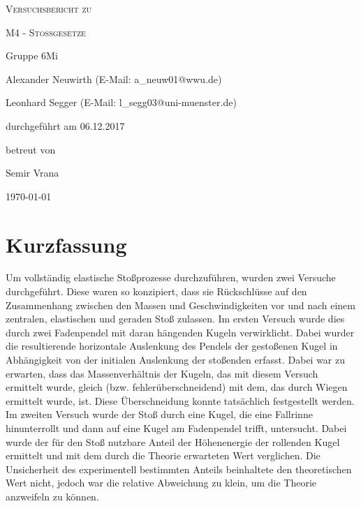 \documentclass[
	a4paper,
	12pt,
	pagesize,
	ngerman
]{scrartcl}
\begin{document}
	
	\begin{titlepage}
		\centering
		{\scshape\LARGE Versuchsbericht zu \par}
		\vspace{1cm}
		{\scshape\huge M4 - Stoßgesetze\par}
		\vspace{2.5cm}
		{\LARGE Gruppe 6Mi \par}
		\vspace{0.5cm}
		
		{\large Alexander Neuwirth (E-Mail: a\_neuw01@wwu.de) \par}
		{\large Leonhard Segger (E-Mail: l\_segg03@uni-muenster.de) \par}
		\vfill
		
		durchgeführt am 06.12.2017\par
		betreut von\par
		{\large Semir Vrana}
		
		\vfill
		
		{\large \today\par}
	\end{titlepage}
	\tableofcontents
	\newpage
	
	\section{Kurzfassung}
	Um vollständig elastische Stoßprozesse durchzuführen, wurden zwei Versuche durchgeführt.
	Diese waren so konzipiert, dass sie Rückschlüsse auf den Zusammenhang zwischen den Massen und Geschwindigkeiten vor und nach einem zentralen, elastischen und geraden Stoß zulassen. %
	Im ersten Versuch wurde dies durch zwei Fadenpendel mit daran hängenden Kugeln verwirklicht.
	Dabei wurder die resultierende horizontale Auslenkung des Pendels der gestoßenen Kugel in Abhängigkeit von der initialen Auslenkung der stoßenden erfasst.
	Dabei war zu erwarten, dass das Massenverhältnis der Kugeln, das mit diesem Versuch ermittelt wurde, gleich (bzw. fehlerüberschneidend) mit dem, das durch Wiegen ermittelt wurde, ist.
	Diese Überschneidung konnte tatsächlich festgestellt werden.
	Im zweiten Versuch wurde der Stoß durch eine Kugel, die eine Fallrinne hinunterrollt und dann auf eine Kugel am Fadenpendel trifft, untersucht.
	Dabei wurde der für den Stoß nutzbare Anteil der Höhenenergie der rollenden Kugel ermittelt und mit dem durch die Theorie erwarteten Wert verglichen.
	Die Unsicherheit des experimentell bestimmten Anteils beinhaltete den theoretischen Wert nicht, jedoch war die relative Abweichung zu klein, um die Theorie anzweifeln zu können. %
	
\end{document}
